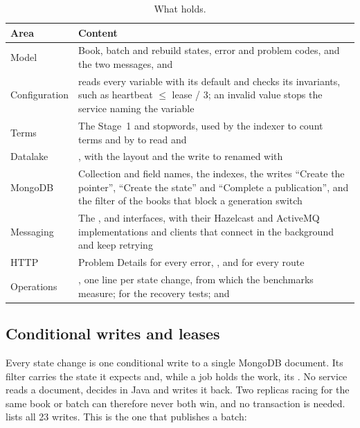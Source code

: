 \begin{table}[ht]
\centering
\small
\caption{What  holds.}
\label{tab:common}
\begin{tabularx}{\textwidth}{@{}L{2.3cm}Y@{}}
\toprule
Area & Content \\
\midrule
Model & Book, batch and rebuild states, error and problem codes, and the two messages,  and  \\
Configuration &  reads every  variable with its default and checks its invariants, such as heartbeat $\leq$ lease / 3; an invalid value stops the service naming the variable \\
Terms & The Stage~1  and stopwords, used by the indexer to count terms and by  to read  and  \\
Datalake & , with the  layout and the write to  renamed with  \\
MongoDB & Collection and field names, the indexes, the writes ``Create the pointer'', ``Create the state'' and ``Complete a publication'', and the filter of the books that block a generation switch \\
Messaging & The ,  and  interfaces, with their Hazelcast and ActiveMQ implementations and clients that connect in the background and keep retrying \\
HTTP & Problem Details for every error, , and  for every  route \\
Operations & , one line per state change, from which the benchmarks measure;  for the recovery tests; and  \\
\bottomrule
\end{tabularx}
\end{table}

\subsection{Conditional writes and leases}
\label{sec:conditional-writes}

Every state change is one conditional write to a single MongoDB document. Its filter carries the state it expects and,
while a job holds the work, its . No service reads a document, decides in Java and writes it back. Two
replicas racing for the same book or batch can therefore never both win, and no transaction is needed.
 lists all 23 writes. This is the one that publishes a batch:

